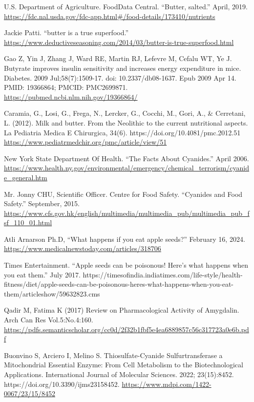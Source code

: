 \documentclass[9.5pt]{article}
\begin{document}
\begin{multicols}{2}
\begin{thebibliography}{9}
{	 U.S. Department of Agriculture. FoodData Central. ``Butter, salted.'' April, 2019. \url{https://fdc.nal.usda.gov/fdc-app.html#/food-details/173410/nutrients}
	
	 Jackie Patti. ``butter is a true superfood.'' \url{https://www.deductiveseasoning.com/2014/03/butter-is-true-superfood.html}
	
	 Gao Z, Yin J, Zhang J, Ward RE, Martin RJ, Lefevre M, Cefalu WT, Ye J. Butyrate improves insulin sensitivity and increases energy expenditure in mice. Diabetes. 2009 Jul;58(7):1509-17. doi: 10.2337/db08-1637. Epub 2009 Apr 14. PMID: 19366864; PMCID: PMC2699871. \url{https://pubmed.ncbi.nlm.nih.gov/19366864/}
	
	 Caramia, G., Losi, G., Frega, N., Lercker, G., Cocchi, M., Gori, A., \& Cerretani, L. (2012). Milk and butter. From the Neolithic to the current nutritional aspects. La Pediatria Medica E Chirurgica, 34(6). https://doi.org/10.4081/pmc.2012.51 \url{https://www.pediatrmedchir.org/pmc/article/view/51}
	
	 New York State Department Of Health. ``The Facts About Cyanides.'' April 2006. \url{https://www.health.ny.gov/environmental/emergency/chemical_terrorism/cyanide_general.htm}
	
	 Mr. Jonny CHU, Scientific Officer. Centre for Food Safety. ``Cyanides and Food Safety.'' September, 2015. \url{https://www.cfs.gov.hk/english/multimedia/multimedia_pub/multimedia_pub_fsf_110_01.html}
	
	 Atli Arnarson Ph.D, ``What happens if you eat apple seeds?'' February 16, 2024. \url{https://www.medicalnewstoday.com/articles/318706}
	
	 Times Entertainment. ``Apple seeds can be poisonous! Here’s what happens when you eat them.'' July 2017. https://timesofindia.indiatimes.com/life-style/health-fitness/diet/apple-seeds-can-be-poisonous-heres-what-happens-when-you-eat-them/articleshow/59632823.cms
	
	 Qadir M, Fatima K (2017) Review on Pharmacological Activity of Amygdalin. Arch Can Res Vol.5:No.4:160. \url{https://pdfs.semanticscholar.org/cc0d/2f32b1fbf5e4ea6889857c56c317723a0e6b.pdf}
	
	 Buonvino S, Arciero I, Melino S. Thiosulfate-Cyanide Sulfurtransferase a Mitochondrial Essential Enzyme: From Cell Metabolism to the Biotechnological Applications. International Journal of Molecular Sciences. 2022; 23(15):8452. https://doi.org/10.3390/ijms23158452. \url{https://www.mdpi.com/1422-0067/23/15/8452}
	
}
\end{thebibliography}
\end{multicols}
\end{document}
